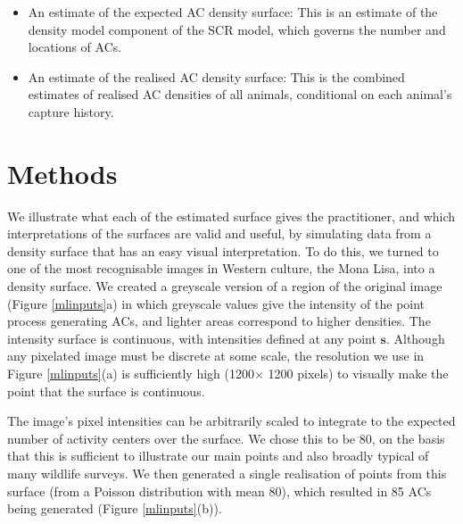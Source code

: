 \documentclass[useAMS,usenatbib,referee]{biom}
\begin{document}

\begin{itemize}
\item An estimate of the expected AC density surface: This is an estimate of the density model component of the SCR model, which governs the number and locations of ACs.
\item An estimate of the realised AC density surface: This is the combined estimates of realised AC densities of all animals, conditional on each animal's capture history.
\end{itemize}


\section{Methods}

We illustrate what each of the estimated surface gives the practitioner, and which interpretations of the surfaces are valid and useful, by simulating data from a density surface that has an easy visual interpretation. To do this, we turned to one of the most recognisable images in Western culture, the Mona Lisa, into a density surface. We created a greyscale version of a region of the original image (Figure \ref{mlinputs}a) in which greyscale values give the intensity of the point process generating ACs, and lighter areas correspond to higher densities. The intensity surface is continuous, with intensities defined at any point $\bm{s}$. Although any pixelated image must be discrete at some scale, the resolution we use in Figure \ref{mlinputs}(a) is sufficiently high (1200$\times$ 1200 pixels) to visually make the point that the surface is continuous.  

The image's pixel intensities can be arbitrarily scaled to integrate to the expected number of activity centers over the surface. We chose this to be 80, on the basis that this is sufficient to illustrate our main points and also broadly typical of many wildlife surveys. We then generated a single realisation of points from this surface (from a Poisson distribution with mean 80), which resulted in 85 ACs being generated (Figure \ref{mlinputs}(b)).
\end{document}
